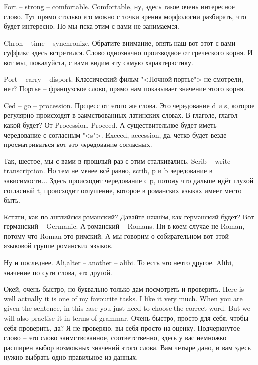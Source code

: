 \documentclass[main.tex]{subfiles}
\begin{document}
Fort -- strong -- comfortable.
Comfortable, ну, здесь такое очень интересное слово.
Тут прямо столько его можно с точки зрения морфологии разбирать, что будет интересно.
Но мы пока этим с вами не занимаемся.

Chron -- time -- synchronize.
Обратите внимание, опять наш вот этот с вами суффикс здесь встретился.
Слово однозначно производное от греческого корня.
И вот мы, пожалуйста, с вами видим эту самую характеристику.

Port -- carry -- disport.
Классический фильм "<Ночной портье"> не смотрели, нет?
Портье -- французское слово, прямо нам показывает значение этого корня.

Ced -- go -- procession.
Процесс от этого же слова.
Это чередование d и s, которое регулярно происходят в заимствованных латинских словах.
В глаголе, глагол какой будет? От Procession.
Proceed.
А существительное будет иметь чередование с согласным "<s">.
Exceed, accession, да, четко будет везде просматриваться вот это чередование согласных.


Так, шестое, мы с вами в прошлый раз с этим сталкивались.
Scrib -- write -- transcription.
Но тем не менее всё равно, scrib, p и b чередование в зависимости...
Здесь происходит чередование с p, потому что дальше идёт глухой согласный t, происходит оглушение, которое в романских языках имеет место быть.

Кстати, как по-английски романский?
Давайте начнём, как германский будет?
Вот германский -- Germanic.
А романский -- Romans.
Ни в коем случае не Roman, потому что Roman это римский.
А мы говорим о собирательном вот этой языковой группе романских языков.

Ну и последнее.
Ali,alter -- another -- alibi.
То есть это нечто другое.
Alibi, значение по сути слова, это другой.

\newpage
{}

Окей, очень быстро, но буквально только дам посмотреть и проверить.
Here is well actually it is one of my favourite tasks.
I like it very much.
When you are given the sentence, in this case you just need to choose the correct word.
But we will also practise it in terms of grammar.
Очень быстро, просто для себя, чтобы себя проверить, да?
Я не проверяю, вы себя просто на оценку.
Подчеркнутое слово -- это слово заимствованное, соответственно, здесь у вас немножко расширен выбор возможных значений этого слова.
Вам четыре дано, и вам здесь нужно выбрать одно правильное из данных.
\\
\end{document}
